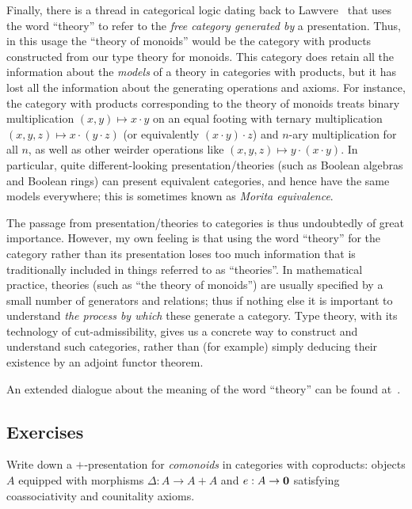 Finally, there is a thread in categorical logic dating back to Lawvere~\cite{lawvere:functsem} that uses the word ``theory'' to refer to the \emph{free category generated by} a presentation.
Thus, in this usage the ``theory of monoids'' would be the category with products constructed from our type theory for monoids.
This category does retain all the information about the \emph{models} of a theory in categories with products, but it has lost all the information about the generating operations and axioms.
For instance, the category with products corresponding to the theory of monoids treats binary multiplication $(x,y) \mapsto x\cdot y$ on an equal footing with ternary multiplication $(x,y,z) \mapsto x\cdot (y\cdot z)$ (or equivalently $(x\cdot y)\cdot z$) and $n$-ary multiplication for all $n$, as well as other weirder operations like $(x,y,z) \mapsto y\cdot (x\cdot y)$.
In particular, quite different-looking presentation/theories (such as Boolean algebras and Boolean rings) can present equivalent categories, and hence have the same models everywhere; this is sometimes known as \emph{Morita equivalence}.

The passage from presentation/theories to categories is thus undoubtedly of great importance.
However, my own feeling is that using the word ``theory'' for the category rather than its presentation loses too much information that is traditionally included in things referred to as ``theories''.
In mathematical practice, theories (such as ``the theory of monoids'') are usually specified by a small number of generators and relations; thus if nothing else it is important to understand \emph{the process by which} these generate a category.
Type theory, with its technology of cut-admissibility, gives us a concrete way to construct and understand such categories, rather than (for example) simply deducing their existence by an adjoint functor theorem.

An extended dialogue about the meaning of the word ``theory'' can be found at~\cite{shulman:what-is-a-theory}.


\subsection*{Exercises}

\begin{ex}\label{ex:catcoprod-comon}
  Write down a $+$-presentation for \emph{comonoids} in categories with coproducts: objects $A$ equipped with morphisms $\Delta:A\to A+A$ and $e:A\to \mathbf{0}$ satisfying coassociativity and counitality axioms.
\end{ex}

